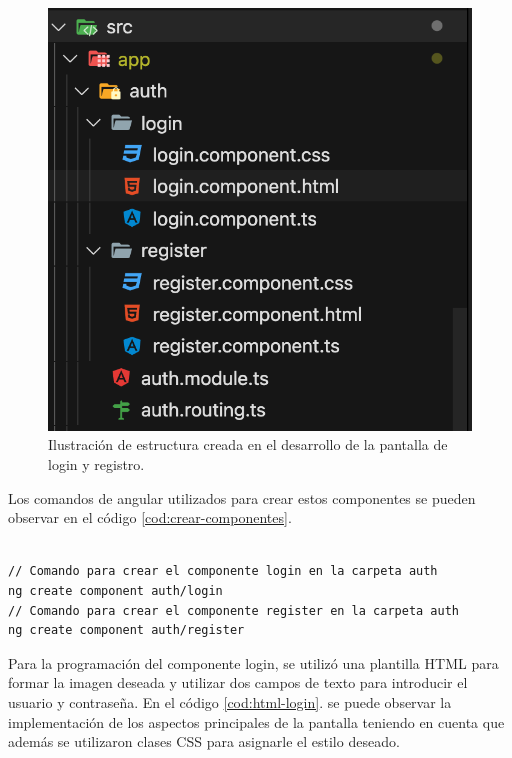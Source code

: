 \begin{figure}[htpb]
	\centering
	\includegraphics[scale=.50]{./Figures/estructura-login-vs.png}
	\caption[Estructura de componentes de login y registro]{Ilustración de estructura creada en el desarrollo de la pantalla de login y registro.}
	\label{fig:estructura-login}
\end{figure}

Los comandos de angular utilizados para crear estos componentes se pueden observar en el código \ref{cod:crear-componentes}.

\begin{lstlisting}[label=cod:crear-componentes,caption=Comandos de Angular para crear componentes de login y registro.] 

// Comando para crear el componente login en la carpeta auth
ng create component auth/login
// Comando para crear el componente register en la carpeta auth
ng create component auth/register

\end{lstlisting} 

Para la programación del componente login, se utilizó una plantilla HTML para formar la imagen deseada y utilizar dos campos de texto para introducir el usuario y contraseña.  En el código \ref{cod:html-login}. se puede observar la implementación de los aspectos principales de la pantalla teniendo en cuenta que además se utilizaron clases CSS para asignarle el estilo deseado. 

